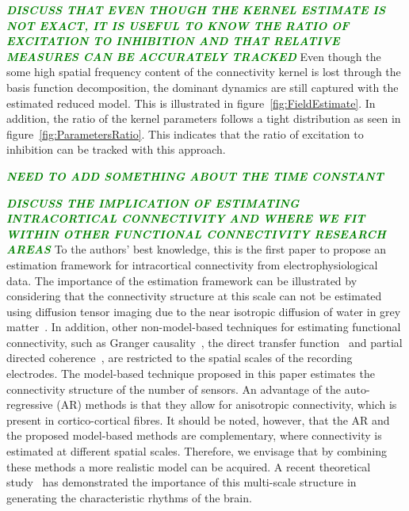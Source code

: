 \documentclass[twocolumn,11pt,a4paper]{article}		%
\newcommand{\dean}[1]{\textsf{\emph{\textbf{\textcolor{green}{#1}}}}}
\begin{document}
\dean{DISCUSS THAT EVEN THOUGH THE KERNEL ESTIMATE IS NOT EXACT, IT IS USEFUL TO KNOW THE RATIO OF EXCITATION TO INHIBITION AND THAT RELATIVE MEASURES CAN BE ACCURATELY TRACKED}
Even though the some high spatial frequency content of the connectivity kernel is lost through the basis function decomposition, the dominant dynamics are still captured with the estimated reduced model. This is illustrated in figure~\ref{fig:FieldEstimate}. In addition, the ratio of the kernel parameters follows a tight distribution as seen in figure~\ref{fig:ParametersRatio}. This indicates that the ratio of excitation to inhibition can be tracked with this approach. 

\dean{NEED TO ADD SOMETHING ABOUT THE TIME CONSTANT }

\dean{DISCUSS THE IMPLICATION OF ESTIMATING INTRACORTICAL CONNECTIVITY AND WHERE WE FIT WITHIN OTHER FUNCTIONAL CONNECTIVITY RESEARCH AREAS}
To the authors' best knowledge, this is the first paper to propose an estimation framework for intracortical connectivity from electrophysiological data. The importance of the estimation framework can be illustrated by considering that the connectivity structure at this scale can not be estimated using diffusion tensor imaging due to the near isotropic diffusion of water in grey matter~\cite{Assaf2008}. In addition, other non-model-based techniques for estimating functional connectivity, such as Granger causality~\cite{Hesse2003}, the direct transfer function~\cite{Kaminski1991} and partial directed coherence~\cite{Sameshima1999}, are restricted to the spatial scales of the recording electrodes. The model-based technique proposed in this paper estimates the connectivity structure of the number of sensors. An advantage of the auto-regressive (AR) methods is that they allow for anisotropic connectivity, which is present in cortico-cortical fibres. It should be noted, however, that the AR and the proposed model-based methods are complementary, where connectivity is estimated at different spatial scales. Therefore, we envisage that by combining these methods a more realistic model can be acquired. A recent theoretical study~\cite{Jirsa2009} has demonstrated the importance of this multi-scale structure in generating the characteristic rhythms of the brain.
\end{document}
